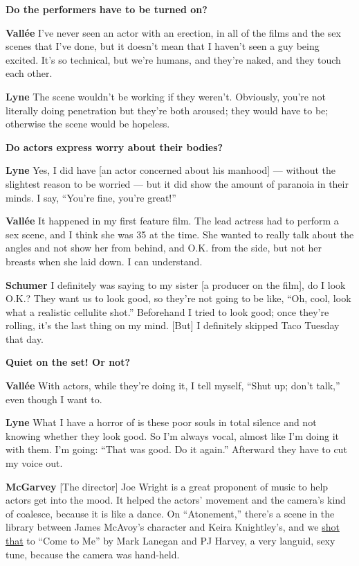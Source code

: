 \textbf{Do the performers have to be turned on?}

\textbf{Vallée} I've never seen an actor with an erection, in all of the
films and the sex scenes that I've done, but it doesn't mean that I
haven't seen a guy being excited. It's so technical, but we're humans,
and they're naked, and they touch each other.

\textbf{Lyne} The scene wouldn't be working if they weren't. Obviously,
you're not literally doing penetration but they're both aroused; they
would have to be; otherwise the scene would be hopeless.

\textbf{Do actors express worry about their bodies?}

\textbf{Lyne} Yes, I did have {[}an actor concerned about his manhood{]}
--- without the slightest reason to be worried --- but it did show the
amount of paranoia in their minds. I say, ``You're fine, you're great!''

\textbf{Vallée} It happened in my first feature film. The lead actress
had to perform a sex scene, and I think she was 35 at the time. She
wanted to really talk about the angles and not show her from behind, and
O.K. from the side, but not her breasts when she laid down. I can
understand.

\textbf{Schumer} I definitely was saying to my sister {[}a producer on
the film{]}, do I look O.K.? They want us to look good, so they're not
going to be like, ``Oh, cool, look what a realistic cellulite shot.''
Beforehand I tried to look good; once they're rolling, it's the last
thing on my mind. {[}But{]} I definitely skipped Taco Tuesday that day.

\textbf{Quiet on the set! Or not?}

\textbf{Vallée} With actors, while they're doing it, I tell myself,
``Shut up; don't talk,'' even though I want to.

\textbf{Lyne} What I have a horror of is these poor souls in total
silence and not knowing whether they look good. So I'm always vocal,
almost like I'm doing it with them. I'm going: ``That was good. Do it
again.'' Afterward they have to cut my voice out.

\textbf{McGarvey} {[}The director{]} Joe Wright is a great proponent of
music to help actors get into the mood. It helped the actors' movement
and the camera's kind of coalesce, because it is like a dance. On
``Atonement,'' there's a scene in the library between James McAvoy's
character and Keira Knightley's, and we
\href{https://www.youtube.com/watch?v=C1x5Q-9oN4I}{shot that} to ``Come
to Me'' by Mark Lanegan and PJ Harvey, a very languid, sexy tune,
because the camera was hand-held.

